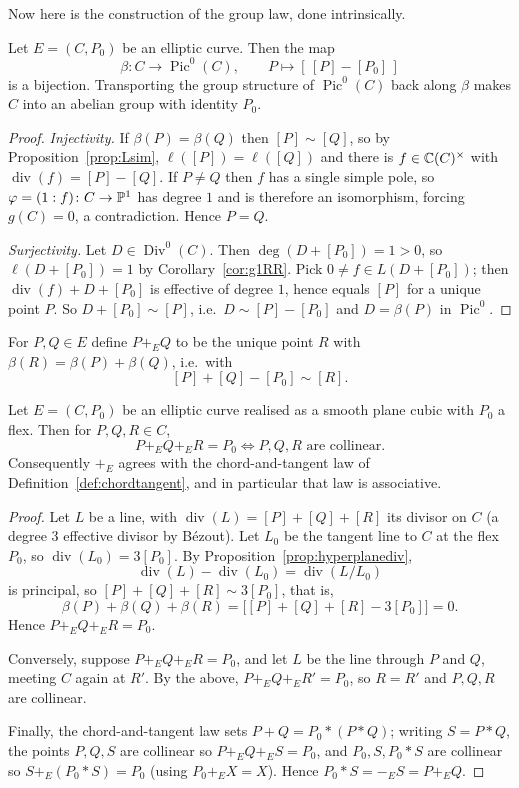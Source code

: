 \documentclass[a4paper]{scrartcl}
\DeclareMathOperator{\Div}{Div}
\DeclareMathOperator{\Divv}{div}
\DeclareMathOperator{\Pic}{Pic}
\begin{document}
Now here is the construction of the group law, done intrinsically.

\begin{theorem}\label{thm:elliptic}
	Let $E = (C,P_0)$ be an elliptic curve. Then the map
	$$\beta \colon C \to \Pic^0(C), \qquad P \mapsto [\,[P] - [P_0]\,]$$
	is a bijection. Transporting the group structure of $\Pic^0(C)$ back along $\beta$ makes $C$ into an abelian group with identity $P_0$.
\end{theorem}

\begin{proof}
	\emph{Injectivity.} If $\beta(P) = \beta(Q)$ then $[P]\sim[Q]$, so by Proposition~\ref{prop:Lsim}, $\ell([P]) = \ell([Q])$ and there is $f \in \mathbb{C}(C)^\times$ with $\Divv(f) = [P]-[Q]$. If $P \neq Q$ then $f$ has a single simple pole, so $\varphi = (1:f) \colon C \to \mathbb{P}^1$ has degree $1$ and is therefore an isomorphism, forcing $g(C) = 0$, a contradiction. Hence $P = Q$.

	\emph{Surjectivity.} Let $D \in \Div^0(C)$. Then $\deg(D + [P_0]) = 1 > 0$, so $\ell(D+[P_0]) = 1$ by Corollary~\ref{cor:g1RR}. Pick $0 \neq f \in L(D+[P_0])$; then $\Divv(f) + D + [P_0]$ is effective of degree $1$, hence equals $[P]$ for a unique point $P$. So $D + [P_0]\sim [P]$, i.e.\ $D \sim [P]-[P_0]$ and $D = \beta(P)$ in $\Pic^0$.
\end{proof}

\begin{definition}
	For $P,Q \in E$ define $P +_E Q$ to be the unique point $R$ with $\beta(R) = \beta(P)+\beta(Q)$, i.e.\ with
	$$[P] + [Q] - [P_0] \sim [R].$$
\end{definition}

\begin{theorem}
	Let $E = (C,P_0)$ be an elliptic curve realised as a smooth plane cubic with $P_0$ a flex. Then for $P,Q,R \in C$,
	$$P +_E Q +_E R = P_0 \iff P, Q, R \text{ are collinear.}$$
	Consequently $+_E$ agrees with the chord-and-tangent law of Definition~\ref{def:chordtangent}, and in particular that law is associative.
\end{theorem}

\begin{proof}
	Let $L$ be a line, with $\Divv(L) = [P]+[Q]+[R]$ its divisor on $C$ (a degree $3$ effective divisor by B\'ezout). Let $L_0$ be the tangent line to $C$ at the flex $P_0$, so $\Divv(L_0) = 3[P_0]$. By Proposition~\ref{prop:hyperplanediv},
	$$\Divv(L) - \Divv(L_0) = \Divv(L/L_0)$$
	is principal, so $[P]+[Q]+[R] \sim 3[P_0]$, that is,
	$$\beta(P)+\beta(Q)+\beta(R) = \big[[P]+[Q]+[R] - 3[P_0]\big] = 0.$$
	Hence $P+_EQ+_ER = P_0$.

	Conversely, suppose $P +_E Q +_E R = P_0$, and let $L$ be the line through $P$ and $Q$, meeting $C$ again at $R'$. By the above, $P+_EQ+_ER' = P_0$, so $R = R'$ and $P,Q,R$ are collinear.

	Finally, the chord-and-tangent law sets $P + Q = P_0 * (P*Q)$; writing $S = P*Q$, the points $P,Q,S$ are collinear so $P+_EQ+_ES = P_0$, and $P_0, S, P_0*S$ are collinear so $S +_E (P_0*S) = P_0$ (using $P_0 +_E X = X$). Hence $P_0 * S = -_E S = P +_E Q$.
\end{proof}
\end{document}
